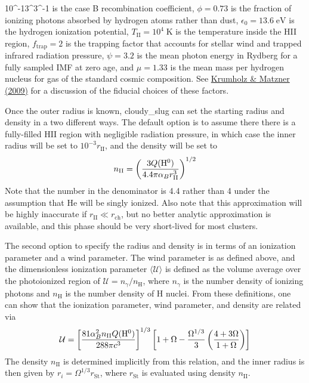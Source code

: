 \documentclass[letterpaper,10pt,english]{sphinxmanual}
\begin{document}
10^{-13}\;^3\;^{-1}\) is the case B recombination
coefficient, \(\phi = 0.73\) is the fraction of ionizing photons absorbed
by hydrogen atoms rather than dust, \(\epsilon_0 =
13.6\;\mathrm{eV}\) is the hydrogen ionization potential,
\(T_{\mathrm{II}} = 10^4\;\mathrm{K}\) is the temperature inside
the HII region, \(f_{\mathrm{trap}} = 2\) is the trapping factor
that accounts for stellar wind and trapped infrared radiation
pressure, \(\psi = 3.2\) is the mean photon energy in Rydberg for
a fully sampled IMF at zero age, and \(\mu = 1.33\) is the mean
mass per hydrogen nucleus for gas of the standard cosmic
composition. See \href{http://adsabs.harvard.edu/abs/2009ApJ...703.1352K}{Krumholz \& Matzner (2009)} for a discussion
of the fiducial choices of these factors.

Once the outer radius is known, cloudy\_slug can set the starting
radius and density in a two different ways. The default option is to
assume there there is a fully-filled HII region with negligible
radiation pressure, in which case the inner radius will be set to
\(10^{-3} r_{\mathrm{II}}\), and the density will be set to
\begin{gather}
\begin{split}n_{\mathrm{II}} = \left(\frac{3
Q(\mathrm{H}^0)}{4.4 \pi\alpha_B
r_{\mathrm{II}}^3}\right)^{1/2}\end{split}\notag
\end{gather}
Note that the number in the denominator is 4.4 rather than 4 under the
assumption that He will be singly ionized. Also note that this
approximation will be highly inaccurate if \(r_{\mathrm{II}} \ll
r_{\mathrm{ch}}\), but no better analytic approximation is available,
and this phase should be very short-lived for most clusters.

The second option to specify the radius and density is in terms of an
ionization parameter and a wind parameter. The wind parameter is as
defined above, and the dimensionless ionization parameter
\(\langle\mathcal{U}\rangle\) is defined as the volume average
over the photoionized region of
\(\mathcal{U} = n_\gamma / n_\mathrm{H}\), where \(n_\gamma\)
is the number density of ionizing photons and \(n_{\mathrm{H}}\)
is the number density of H nuclei. From these definitions, one can
show that the ionization parameter, wind parameter, and density are
related via
\begin{gather}
\begin{split}\mathcal{U} = \left[\frac{81 \alpha_B^2 n_{\mathrm{II}}
Q(\mathrm{H}^0)}{288 \pi c^3}\right]^{1/3}
\left[1 + \Omega - \frac{\Omega^{1/3}}{3}
\left(\frac{4+3\Omega}{1+\Omega}\right)\right]\end{split}\notag
\end{gather}
The density \(n_{\mathrm{II}}\) is determined implicitly from this
relation, and the inner radius is then given by
\(r_i = \Omega^{1/3} r_{\mathrm{St}}\),
where \(r_{\mathrm{St}}\) is evaluated using density
\(n_{\mathrm{II}}\).
\end{document}
